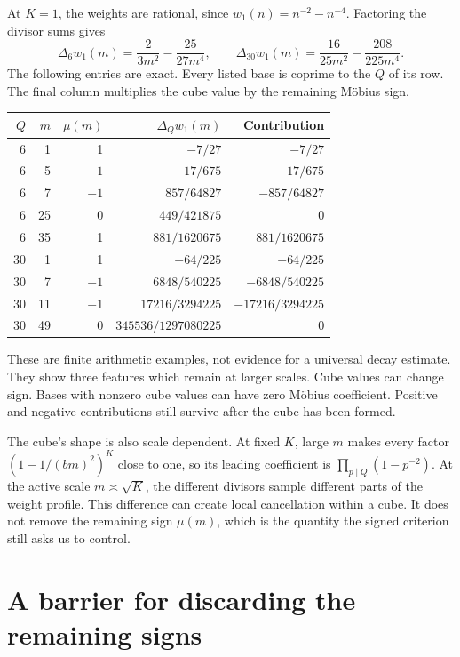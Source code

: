 At \(K=1\), the weights are rational, since \(w_1(n)=n^{-2}-n^{-4}\). Factoring the divisor sums gives
\begin{equation}\label{rh:smallcubes}
\Delta_6w_1(m)=\frac2{3m^2}-\frac{25}{27m^4},
\qquad
\Delta_{30}w_1(m)=\frac{16}{25m^2}-\frac{208}{225m^4}.
\end{equation}
The following entries are exact. Every listed base is coprime to the \(Q\) of its row. The final column multiplies the cube value by the remaining Möbius sign.
\begin{center}
\begin{tabular}{rrrrr}
\toprule
\(Q\)&\(m\)&\(\mu(m)\)&\(\Delta_Qw_1(m)\)&Contribution\\
\midrule
6&1&1&\(-7/27\)&\(-7/27\)\\
6&5&\(-1\)&\(17/675\)&\(-17/675\)\\
6&7&\(-1\)&\(857/64827\)&\(-857/64827\)\\
6&25&0&\(449/421875\)&0\\
6&35&1&\(881/1620675\)&\(881/1620675\)\\
\midrule
30&1&1&\(-64/225\)&\(-64/225\)\\
30&7&\(-1\)&\(6848/540225\)&\(-6848/540225\)\\
30&11&\(-1\)&\(17216/3294225\)&\(-17216/3294225\)\\
30&49&0&\(345536/1297080225\)&0\\
\bottomrule
\end{tabular}
\end{center}
These are finite arithmetic examples, not evidence for a universal decay estimate. They show three features which remain at larger scales. Cube values can change sign. Bases with nonzero cube values can have zero Möbius coefficient. Positive and negative contributions still survive after the cube has been formed.

The cube's shape is also scale dependent. At fixed \(K\), large \(m\) makes every factor \((1-1/(bm)^2)^K\) close to one, so its leading coefficient is \(\prod_{p\mid Q}(1-p^{-2})\). At the active scale \(m\asymp\sqrt K\), the different divisors sample different parts of the weight profile. This difference can create local cancellation within a cube. It does not remove the remaining sign \(\mu(m)\), which is the quantity the signed criterion still asks us to control.

\section{A barrier for discarding the remaining signs}

